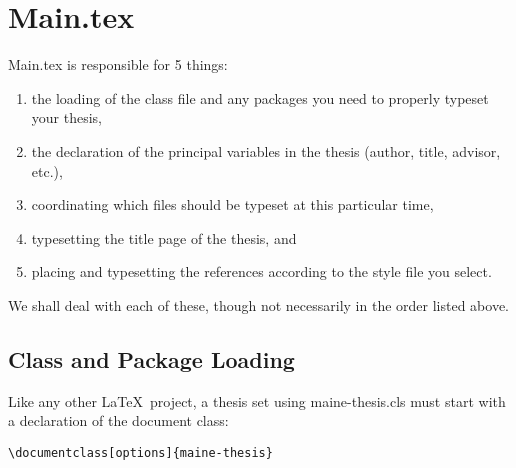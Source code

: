 \chapter{Main.tex}
Main.tex is responsible for 5 things:
\begin{enumerate}
\item{the loading of the class file and any packages you need to properly typeset your thesis,}
\item{the declaration of the principal variables in the thesis (author, title, advisor, etc.),}
\item{coordinating which files should be typeset at this particular time,}
\item{typesetting the title page of the thesis, and}
\item{placing and typesetting the references according to the style file you select.}
\end{enumerate}
We shall deal with each of these, though not necessarily in the order listed above.

\section{Class and Package Loading}\label{class}
Like any other \LaTeX\ project, a thesis set using maine-thesis.cls must start with a declaration of the document class:

\begin{verbatim}
\documentclass[options]{maine-thesis}
\end{verbatim}

